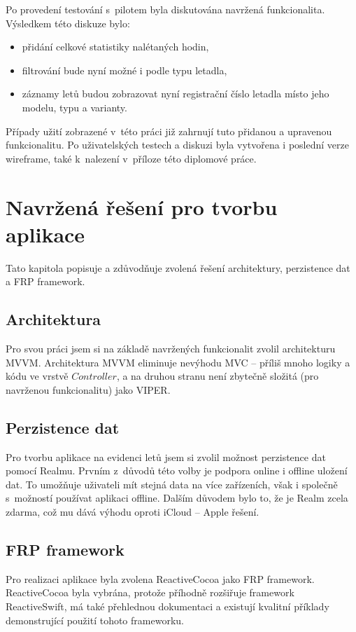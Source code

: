 \documentclass[thesis=M,czech]{FITthesis}[2012/06/26]
\begin{document}
Po provedení testování s~pilotem byla diskutována navržená funkcionalita. Výsledkem této diskuze bylo:
\begin{itemize}
\item přidání celkové statistiky nalétaných hodin,
\item filtrování bude nyní možné i podle typu letadla,
\item záznamy letů budou zobrazovat nyní registrační číslo letadla místo jeho modelu, typu a varianty.
\end{itemize}

Případy užití zobrazené v~této práci již zahrnují tuto přidanou a upravenou funkcionalitu. Po uživatelských testech a diskuzi byla vytvořena i poslední verze wireframe, také k~nalezení v~příloze této diplomové práce.

\section{Navržená řešení pro tvorbu aplikace}
Tato kapitola popisuje a zdůvodňuje zvolená řešení architektury, perzistence dat a FRP framework.

\subsection{Architektura}
Pro svou práci jsem si na základě navržených funkcionalit zvolil architekturu MVVM. Architektura MVVM eliminuje nevýhodu MVC -- příliš mnoho logiky a kódu ve vrstvě $Controller$, a na druhou stranu není zbytečně složitá (pro navrženou funkcionalitu) jako VIPER.

\subsection{Perzistence dat}
Pro tvorbu aplikace na evidenci letů jsem si zvolil možnost perzistence dat pomocí Realmu. Prvním z~důvodů této volby je podpora online i offline uložení dat. To umožňuje uživateli mít stejná data na více zařízeních, však i společně s~možností používat aplikaci offline. Dalším důvodem bylo to, že je Realm zcela zdarma, což mu dává výhodu oproti iCloud -- Apple řešení.

\subsection{FRP framework}
Pro realizaci aplikace byla zvolena ReactiveCocoa jako FRP framework. ReactiveCocoa byla vybrána, protože příhodně rozšiřuje framework ReactiveSwift, má také přehlednou dokumentaci a existují kvalitní příklady demonstrující použití tohoto frameworku.
\end{document}
